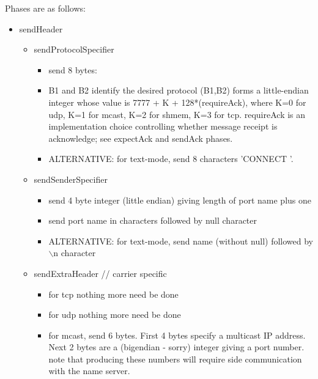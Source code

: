 \documentclass[a4]{article}
\newcommand{\packet}[1]{\framebox{#1}}
\begin{document}
Phases are as follows:

\begin{itemize}

\item sendHeader
    
  \begin{itemize}

    \item sendProtocolSpecifier

      \begin{itemize}

      \item send 8 bytes: \packet{'Y' 'A' B1 B2 0 0 'R' 'P'}
      \item B1 and B2 identify the desired protocol
      (B1,B2) forms a little-endian integer whose value is
         7777 + K + 128*(requireAck),
      where K=0 for udp, K=1 for mcast, K=2 for shmem, K=3 for tcp.
      requireAck is an implementation choice controlling
      whether message receipt is acknowledge; see expectAck and sendAck
      phases.
    
      \item ALTERNATIVE: for text-mode, send 8 characters 'CONNECT '.
	
      \end{itemize}

    \item sendSenderSpecifier
      
      \begin{itemize}
      \item send 4 byte integer (little endian) giving length of port
      name plus one
      \item send port name in characters followed by null character
      \item ALTERNATIVE: for text-mode, send name (without null)
      followed by $\backslash$n character
      \end{itemize}

    \item sendExtraHeader      // carrier specific
      \begin{itemize}
	\item for tcp nothing more need be done
	\item for udp nothing more need be done
	\item for mcast, send 6 bytes.
         First 4 bytes specify a multicast IP address.
	 Next 2 bytes are a (bigendian - sorry) integer giving a port number.
         note that producing these numbers will require side communication
         with the name server.
      \end{itemize}
  \end{itemize}


\end{itemize}
\end{document}
